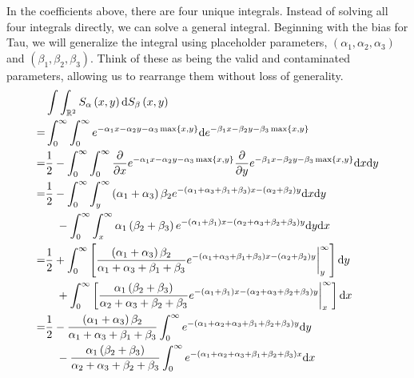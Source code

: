 \hspace{24pt} In the coefficients above, there are four unique integrals. Instead of solving all four integrals directly, we can solve a general integral. Beginning with the bias for Tau, we will generalize the integral using placeholder parameters, $(\alpha_1,\alpha_2,\alpha_3)$ and $\left(\beta_1,\beta_2,\beta_3\right)$. Think of these as being the valid and contaminated parameters, allowing us to rearrange them without loss of generality.
\begin{align*}
    &\int\int_{\mathbb{R}^2}S_{\alpha}\left(x,y\right)\mathrm{d}S_{\beta}\left(x,y\right)\\
    =&\int_0^{\infty}\int_0^{\infty}e^{-\alpha_1x-\alpha_2y-\alpha_3\max\left\{x,y\right\}}\mathrm{d}e^{-\beta_1x-\beta_2y-\beta_3\max\left\{x,y\right\}}\\
    =&\frac{1}{2}-\int_0^{\infty}\int_0^{\infty}\frac{\partial}{\partial x}e^{-\alpha_1x-\alpha_2y-\alpha_3\max\left\{x,y\right\}}\frac{\partial}{\partial y}e^{-\beta_1x-\beta_2y-\beta_3\max\left\{x,y\right\}}\mathrm{d}x\mathrm{d}y\\
    =&\frac{1}{2}-\int_0^{\infty}\int_y^{\infty}\left(\alpha_1+\alpha_3\right)\beta_2e^{-\left(\alpha_1+\alpha_3+\beta_1+\beta_3\right)x-\left(\alpha_2+\beta_2\right)y}\mathrm{d}x\mathrm{d}y\\
    &\hspace{3.5mm}-\int_0^{\infty}\int_x^{\infty}\alpha_1\left(\beta_2+\beta_3\right)e^{-\left(\alpha_1+\beta_1\right)x-\left(\alpha_2+\alpha_3+\beta_2+\beta_3\right)y}\mathrm{d}y\mathrm{d}x\\
    =&\frac{1}{2}+\int_0^{\infty}\left[\frac{\left(\alpha_1+\alpha_3\right)\beta_2}{\alpha_1+\alpha_3+\beta_1+\beta_3}e^{-\left(\alpha_1+\alpha_3+\beta_1+\beta_3\right)x-\left(\alpha_2+\beta_2\right)y}\bigg|_y^{\infty}\right]\mathrm{d}y\\
    &\hspace{3.5mm}+\int_0^{\infty}\left[\frac{\alpha_1\left(\beta_2+\beta_3\right)}{\alpha_2+\alpha_3+\beta_2+\beta_3}e^{-\left(\alpha_1+\beta_1\right)x-\left(\alpha_2+\alpha_3+\beta_2+\beta_3\right)y}\bigg|_x^{\infty}\right]\mathrm{d}x\\
    =&\frac{1}{2}-\frac{\left(\alpha_1+\alpha_3\right)\beta_2}{\alpha_1+\alpha_3+\beta_1+\beta_3}\int_0^{\infty}e^{-\left(\alpha_1+\alpha_2+\alpha_3+\beta_1+\beta_2+\beta_3\right)y}\mathrm{d}y\\
    &\hspace{3.5mm}-\frac{\alpha_1\left(\beta_2+\beta_3\right)}{\alpha_2+\alpha_3+\beta_2+\beta_3}\int_0^{\infty}e^{-\left(\alpha_1+\alpha_2+\alpha_3+\beta_1+\beta_2+\beta_3\right)x}\mathrm{d}x\\

\end{align*}
